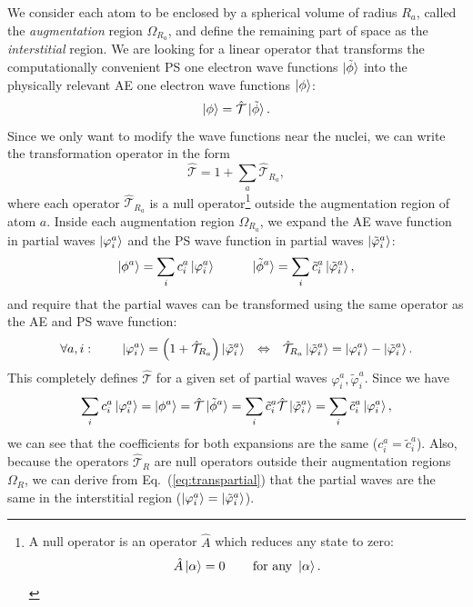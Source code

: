 \begin{refsection}
We consider each atom to be enclosed by a spherical volume of radius $R_a$, called the \textit{augmentation} region $\Omega_{R_a}$, and define the remaining part of space as the \textit{interstitial} region. We are looking for a linear operator that transforms the computationally convenient PS one electron wave functions $\ket{\tilde{\phi}}$ into the physically relevant AE one electron wave functions $\ket{\phi}$:
\begin{equation}\label{eq:PAW}
\ket{\phi} = \hat{\mathcal{T}} \ket{\tilde{\phi}}.
\end{equation}
Since we only want to modify the wave functions near the nuclei, we can write the transformation operator in the form
\begin{equation}
\hat{\mathcal{T}} = 1 + \sum_a \hat{\mathcal{T}}_{R_a},
\end{equation}
where each operator $\hat{\mathcal{T}}_{R_a}$ is a null operator\footnote{A null operator is an operator $\hat{A}$ which reduces any state to zero:\begin{equation*}\hat{A}\ket{\alpha}=0\hspace{0.3in}\text{for any } \ket{\alpha}.\end{equation*}} outside the augmentation region of atom $a$. Inside each augmentation region $\Omega_{R_a}$, we expand the AE wave function in partial waves $\ket{\varphi_i^a}$ and the PS wave function in partial waves $\ket{\tilde{\varphi}_i^a}$:
\begin{equation}
\ket{\phi^a} = \sum_i c_i^a \ket{\varphi_i^a} \hspace{0.4in} \ket{\tilde{\phi}^a} = \sum_i \tilde{c}_i^a \ket{\tilde{\varphi}_i^a},
\end{equation}
and require that the partial waves can be transformed using the same operator as the AE and PS wave function:
\begin{equation}\label{eq:transpartial}
\forall a,i:\hspace{0.3in}\ket{\varphi_i^a} = \left( 1 + \hat{\mathcal{T}}_{R_a} \right) \ket{\tilde{\varphi}_i^a} \hspace{0.1in} \Leftrightarrow \hspace{0.1in} \hat{\mathcal{T}}_{R_a} \ket{\tilde{\varphi}_i^a} = \ket{\varphi_i^a} - \ket{\tilde{\varphi}_i^a}.
\end{equation}
This completely defines $\hat{\mathcal{T}}$ for a given set of partial waves $\varphi_i^a,\tilde{\varphi}_i^a$. Since we have
\begin{equation}
\sum_i c_i^a \ket{\varphi_i^a} = \ket{\phi^a} = \hat{\mathcal{T}} \ket{\tilde{\phi}^a} = \sum_i \tilde{c}_i^a \hat{\mathcal{T}} \ket{\tilde{\varphi}_i^a} = \sum_i \tilde{c}_i^a \ket{\varphi_i^a},
\end{equation}
we can see that the coefficients for both expansions are the same ($c_i^a = \tilde{c}_i^a$). Also, because the operators $\hat{\mathcal{T}}_R$ are null operators outside their augmentation regions $\Omega_R$, we can derive from Eq.~(\ref{eq:transpartial}) that the partial waves are the same in the interstitial region ($\ket{\varphi_i^a} = \ket{\tilde{\varphi}_i^a}$).


\end{refsection}

